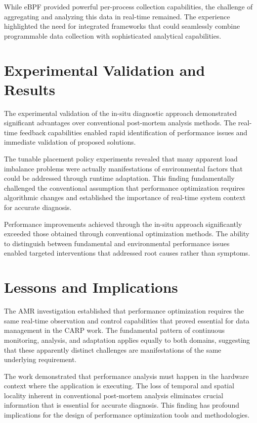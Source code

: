 While eBPF provided powerful per-process collection capabilities, the challenge of aggregating
and analyzing this data in real-time remained.
The experience highlighted the need for integrated frameworks that could seamlessly combine
programmable data collection with sophisticated analytical capabilities.

\section{Experimental Validation and Results}

The experimental validation of the in-situ diagnostic approach demonstrated significant advantages
over conventional post-mortem analysis methods.
The real-time feedback capabilities enabled rapid identification of performance issues and
immediate validation of proposed solutions.

The tunable placement policy experiments revealed that many apparent load imbalance problems were
actually manifestations of environmental factors that could be addressed through runtime
adaptation.
This finding fundamentally challenged the conventional assumption that performance optimization
requires algorithmic changes and established the importance of real-time system context for
accurate diagnosis.

Performance improvements achieved through the in-situ approach significantly exceeded those
obtained through conventional optimization methods.
The ability to distinguish between fundamental and environmental performance issues enabled
targeted interventions that addressed root causes rather than symptoms.

\section{Lessons and Implications}

The AMR investigation established that performance optimization requires the same real-time
observation and control capabilities that proved essential for data management in the CARP work.
The fundamental pattern of continuous monitoring, analysis, and adaptation applies equally to
both domains, suggesting that these apparently distinct challenges are manifestations of the
same underlying requirement.

The work demonstrated that performance analysis must happen in the hardware context where the
application is executing.
The loss of temporal and spatial locality inherent in conventional post-mortem analysis
eliminates crucial information that is essential for accurate diagnosis.
This finding has profound implications for the design of performance optimization tools and
methodologies.

